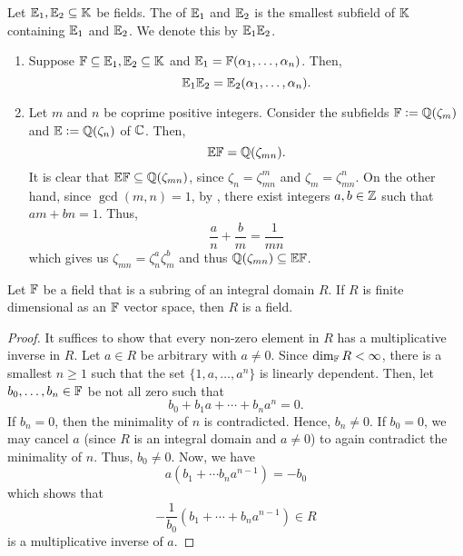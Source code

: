 \begin{defn}
    Let $\mathbb{E}_1,\mathbb{E}_2 \subseteq \mathbb{K}$ be fields. The  of $\mathbb{E}_1$ and $\mathbb{E}_2$ is the smallest subfield of $\mathbb{K}$ containing $\mathbb{E}_1$ and $\mathbb{E}_2$. We denote this by $\mathbb{E}_1\mathbb{E}_2$.
\end{defn}

\begin{ex}
    \phantom{hi}
    \begin{enumerate}
        \item Suppose $\mathbb{F} \subseteq \mathbb{E}_1, \mathbb{E}_2 \subseteq \mathbb{K}$ and $\mathbb{E}_1 = \mathbb{F}(\alpha_1, \ldots, \alpha_n)$. Then,
        \[
            \mathbb{E}_1\mathbb{E}_2 = \mathbb{E}_2(\alpha_1, \ldots, \alpha_n).
        \]
        
        \item Let $m$ and $n$ be coprime positive integers. Consider the subfields $\mathbb{F} \vcentcolon= \mathbb{Q}(\zeta_m)$ and $\mathbb{E} \vcentcolon= \mathbb{Q}(\zeta_n)$ of $\mathbb{C}$. Then, 
        \[
            \mathbb{E}\mathbb{F} = \mathbb{Q}(\zeta_{mn}).
        \]
        It is clear that $\mathbb{E}\mathbb{F} \subseteq \mathbb{Q}(\zeta_{mn})$, since $\zeta_n = \zeta^m_{mn}$ and $\zeta_m = \zeta^n_{mn}$. On the other hand, since $\gcd(m,n) = 1$, by , there exist integers $a,b \in \mathbb{Z}$ such that $am + bn =1$. Thus, 
        \[
            \frac{a}{n} + \frac{b}{m} = \frac{1}{mn}
        \]
        which gives us $\zeta_{mn} = \zeta_n^a\zeta_m^b$ and thus $\mathbb{Q}(\zeta_{mn}) \subseteq \mathbb{E}\mathbb{F}$.
    \end{enumerate}
\end{ex}

\begin{prop} \label{prop:finite-dimensional-vector-space-implies-ID-is-field}
    Let $\mathbb{F}$ be a field that is a subring of an integral domain $R$. If $R$ is finite dimensional as an $\mathbb{F}$ vector space, then $R$ is a field.
\end{prop}
\begin{proof}
    It suffices to show that every non-zero element in $R$ has a multiplicative inverse in $R$. Let $a \in R$ be arbitrary with $a \neq 0$. Since $\dim_{\mathbb{F}}R < \infty$, there is a smallest $n \geq 1$ such that the set $\{1, a, \ldots, a^n\}$ is linearly dependent. Then, let $b_0, \ldots, b_n \in \mathbb{F}$ be not all zero such that
    \[
        b_0 + b_1 a + \cdots + b_n a^n = 0.
    \]
    If $b_n = 0$, then the minimality of $n$ is contradicted. Hence, $b_n \neq 0$. If $b_0 = 0$, we may cancel $a$ (since $R$ is an integral domain and $a \neq 0$) to again contradict the minimality of $n$. Thus, $b_0 \neq 0$. Now, we have
    \[
        a(b_1 + \cdots b_na^{n-1}) = -b_0
    \]
    which shows that
    \[
        -\frac{1}{b_0} (b_1 + \cdots + b_na^{n-1}) \in R
    \]
    is a multiplicative inverse of $a$.
\end{proof}

